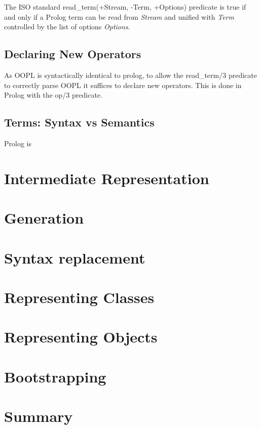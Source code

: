 \documentclass[12pt,a4paper,twoside,openright]{report}
\begin{document}
The ISO standard \cite{ISOPROLOG} read_term(+Stream, -Term, +Options) predicate is true if and only if a Prolog term can be read from \emph{Stream} and unified with \emph{Term} controlled by the list of options \emph{Options}. 

\subsection{Declaring New Operators}

As OOPL is syntactically identical to prolog, to allow the read_term/3 predicate to correctly parse OOPL it suffices to declare new operators. This is done in Prolog with the op/3 predicate. 

\subsection{Terms: Syntax vs Semantics}

Prolog is 

\section{Intermediate Representation}

\section{Generation}



\section{Syntax replacement}

\section{Representing Classes}

\section{Representing Objects}

\section{Bootstrapping}

\section{Summary}
\end{document}
